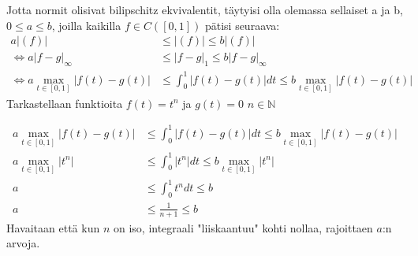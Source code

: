\documentclass[12pt,a4paper,leqno]{amsart}
\begin{document}
Jotta normit olisivat bilipschitz ekvivalentit, täytyisi olla olemassa sellaiset a ja b, $0 \le a \leq b$, joilla kaikilla $f \in C([0,1])$ pätisi seuraava:
\begin{align*} 
a |(f)| &\leq |(f)| \leq b |(f)| \\
 \iff a | f - g |_\infty &\leq |f - g|_1 \leq b| f - g |_\infty \\
 \iff a \max_{t \in [0,1]} \vert f(t) - g(t) \vert &\leq \int_0^1 \vert f(t) - g(t) \vert dt \leq b \max_{t \in [0,1]} \vert f(t) - g(t) \vert
\end{align*}
Tarkastellaan funktioita $f(t) = t^n$ ja $g(t) = 0$ $n \in \mathbb{N}$

\begin{align*}
    a \max_{t \in [0,1]} \vert f(t) - g(t) \vert &\leq \int_0^1 \vert f(t) - g(t) \vert dt \leq b \max_{t \in [0,1]} \vert f(t) - g(t) \vert \\
    a \max_{t \in [0,1]} \vert t^n \vert &\leq \int_0^1 \vert t^n \vert dt \leq b \max_{t \in [0,1]} \vert t^n \vert \\
    a  & \leq \int_0^1 t^n dt \leq b \\
    a  & \leq \frac{1}{n+1} \leq b
\end{align*}
Havaitaan että kun $n$ on iso, integraali "liiskaantuu" kohti nollaa, rajoittaen $a$:n arvoja. 

\bigskip
\end{document}
